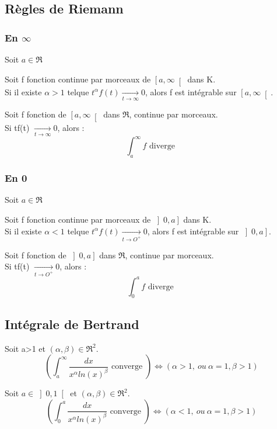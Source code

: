 \subsection{Règles de Riemann}
\subsubsection{En $\infty$}
Soit $a \in \Re$
\begin{enon}
Soit f fonction continue par morceaux de $\left[a,\infty \right[ $ dans K.\\
Si il existe $\alpha > 1$ telque $t^{\alpha}f(t) \underset{t \rightarrow \infty}\rightarrow 0$, alors f est intégrable sur $\left[a,\infty \right[$.
\end{enon}
\begin{prop}
Soit f fonction de $\left[a,\infty \right[$ dans $\Re$, continue par morceaux.\\
Si tf(t) $\underset{t \rightarrow \infty}\rightarrow 0$, alors :
$$\int_a^{\infty} f \mbox{ diverge }$$
\end{prop}
\subsubsection{En 0}
Soit $a \in \Re$
\begin{enon}
Soit f fonction continue par morceaux de $\left]0,a \right] $ dans K.\\
Si il existe $\alpha < 1$ telque $t^{\alpha}f(t) \underset{t \rightarrow O^+}\rightarrow 0$, alors f est intégrable sur $\left]0,a\right]$.
\end{enon}
\begin{prop}
Soit f fonction de $\left]0,a\right]$ dans $\Re$, continue par morceaux.\\
Si tf(t) $\underset{t \rightarrow O^+}\rightarrow 0$, alors :
$$\int_0^{a} f \mbox{ diverge }$$
\end{prop}
\subsection{Intégrale de Bertrand}
\begin{prop}
Soit a>1 et $(\alpha,\beta) \in \Re^2$.
$$\left(\int_a^{\infty} \dfrac{dx}{x^{\alpha}ln(x)^{\beta}} \mbox{ converge }\right) \Leftrightarrow ( \alpha > 1,~ ou~ \alpha=1,\beta>1)$$
\end{prop}
\begin{prop}
Soit $a \in \left]0,1\right[$ et $(\alpha,\beta) \in \Re^2$.
$$\left(\int_0^{a} \dfrac{dx}{x^{\alpha}ln(x)^{\beta}} \mbox{ converge }\right) \Leftrightarrow ( \alpha < 1,~ ou~ \alpha=1,\beta>1)$$
\end{prop}
